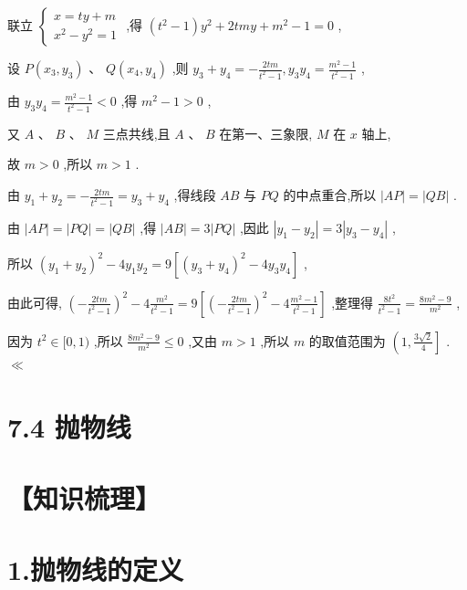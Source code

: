 \documentclass[10pt]{article}
\begin{document}
联立 \(\left\{  \begin{array}{l} x = {ty} + m \\  {x}^{2} - {y}^{2} = 1 \end{array}\right.\) ,得 \(\left( {{t}^{2} - 1}\right) {y}^{2} + {2tmy} + {m}^{2} - 1 = 0\) ,

设 \(P\left( {{x}_{3},{y}_{3}}\right) \text{ 、 }Q\left( {{x}_{4},{y}_{4}}\right)\) ,则 \({y}_{3} + {y}_{4} =  - \frac{2tm}{{t}^{2} - 1},{y}_{3}{y}_{4} = \frac{{m}^{2} - 1}{{t}^{2} - 1}\) ,

由 \({y}_{3}{y}_{4} = \frac{{m}^{2} - 1}{{t}^{2} - 1} < 0\) ,得 \({m}^{2} - 1 > 0\) ,

又 \(A\text{ 、 }B\text{ 、 }M\) 三点共线,且 \(A\text{ 、 }B\) 在第一、三象限, \(M\) 在 \(x\) 轴上,

故 \(m > 0\) ,所以 \(m > 1\) .

由 \({y}_{1} + {y}_{2} =  - \frac{2tm}{{t}^{2} - 1} = {y}_{3} + {y}_{4}\) ,得线段 \({AB}\) 与 \({PQ}\) 的中点重合,所以 \(\left| {AP}\right|  = \left| {QB}\right|\) .

由 \(\left| {AP}\right|  = \left| {PQ}\right|  = \left| {QB}\right|\) ,得 \(\left| {AB}\right|  = 3\left| {PQ}\right|\) ,因此 \(\left| {{y}_{1} - {y}_{2}}\right|  = 3\left| {{y}_{3} - {y}_{4}}\right|\) ,

所以 \({\left( {y}_{1} + {y}_{2}\right) }^{2} - 4{y}_{1}{y}_{2} = 9\left\lbrack  {{\left( {y}_{3} + {y}_{4}\right) }^{2} - 4{y}_{3}{y}_{4}}\right\rbrack\) ,

由此可得, \({\left( -\frac{2tm}{{t}^{2} - 1}\right) }^{2} - 4\frac{{m}^{2}}{{t}^{2} - 1} = 9\left\lbrack  {{\left( -\frac{2tm}{{t}^{2} - 1}\right) }^{2} - 4\frac{{m}^{2} - 1}{{t}^{2} - 1}}\right\rbrack\) ,整理得 \(\frac{8{t}^{2}}{{t}^{2} - 1} = \frac{8{m}^{2} - 9}{{m}^{2}}\) ,

因为 \({t}^{2} \in  \lbrack 0,1)\) ,所以 \(\frac{8{m}^{2} - 9}{{m}^{2}} \leq  0\) ,又由 \(m > 1\) ,所以 \(m\) 的取值范围为 \(\left( {1,\frac{3\sqrt{2}}{4}}\right\rbrack\) . \(\ll\)

\section*{7.4 抛物线}

\section*{【知识梳理】}

\section*{1.抛物线的定义}
\end{document}

